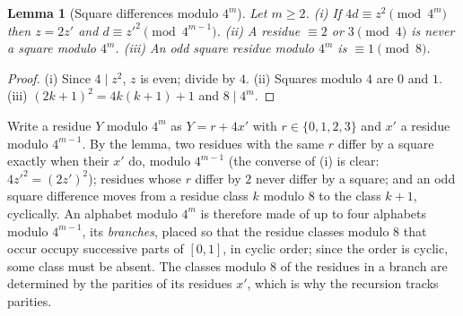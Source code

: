 \documentclass[11pt]{article}
\newtheorem{lemma}[theorem]{Lemma}
\theoremstyle{definition}
\theoremstyle{remark}
\begin{document}
\begin{lemma}[Square differences modulo $4^m$]\label{lem:dyadic}
Let $m\ge2$. (i) If $4d\equiv z^2\pmod{4^m}$ then $z=2z'$ and
$d\equiv z'^2\pmod{4^{m-1}}$. (ii) A residue $\equiv2$ or $3\pmod4$ is never
a square modulo $4^m$. (iii) An odd square residue modulo $4^m$ is
$\equiv1\pmod8$.
\end{lemma}
\begin{proof}
(i) Since $4\mid z^2$, $z$ is even; divide by $4$. (ii) Squares modulo $4$ are
$0$ and $1$. (iii) $(2k+1)^2=4k(k+1)+1$ and $8\mid4^m$.
\end{proof}
Write a residue $Y$ modulo $4^m$ as $Y=r+4x'$ with $r\in\{0,1,2,3\}$ and
$x'$ a residue modulo $4^{m-1}$. By the lemma, two residues with the same $r$
differ by a square exactly when their $x'$ do, modulo $4^{m-1}$ (the converse
of (i) is clear: $4z'^2=(2z')^2$); residues whose $r$ differ by $2$ never
differ by a square; and an odd square difference moves from a residue class
$k$ modulo $8$ to the class $k+1$, cyclically. An alphabet modulo $4^m$ is
therefore made of up to four alphabets modulo $4^{m-1}$, its
\emph{branches}, placed so that the residue classes modulo $8$ that occur
occupy successive parts of $[0,1]$, in cyclic order; since the order is
cyclic, some class must be absent. The classes modulo $8$ of the
residues in a branch are determined by the parities of its residues $x'$,
which is why the recursion tracks parities.
\end{document}
